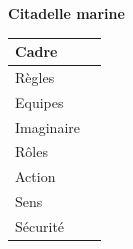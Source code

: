 
\begin{center}
{\huge \textbf{Citadelle marine}}\\ \vspace{0.5em}

\renewcommand{\arraystretch}{1.40}
\begin{tabular}{|C{5em}|C{25em}|}
\hline
Cadre  &   \\
\hline
Règles  &   \\
\hline
Equipes &   \\
\hline
Imaginaire & \\
\hline
Rôles & \\
\hline
Action &  \\
\hline
Sens &  \\
\hline
Sécurité & \\
\hline
\end{tabular}
\end{center}

\vspace{1cm}
